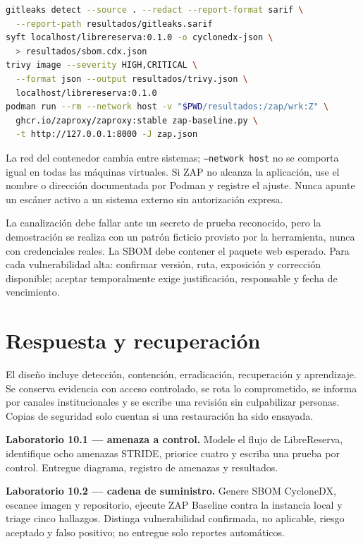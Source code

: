 \begin{lstlisting}[language=bash,caption={Controles reproducibles sobre repositorio e imagen.}]
gitleaks detect --source . --redact --report-format sarif \
  --report-path resultados/gitleaks.sarif
syft localhost/librereserva:0.1.0 -o cyclonedx-json \
  > resultados/sbom.cdx.json
trivy image --severity HIGH,CRITICAL \
  --format json --output resultados/trivy.json \
  localhost/librereserva:0.1.0
podman run --rm --network host -v "$PWD/resultados:/zap/wrk:Z" \
  ghcr.io/zaproxy/zaproxy:stable zap-baseline.py \
  -t http://127.0.0.1:8000 -J zap.json
\end{lstlisting}

La red del contenedor cambia entre sistemas; \texttt{--network host} no se comporta igual en todas las máquinas virtuales. Si ZAP no alcanza la aplicación, use el nombre o dirección documentada por Podman y registre el ajuste. Nunca apunte un escáner activo a un sistema externo sin autorización expresa.

\begin{validacion}
La canalización debe fallar ante un secreto de prueba reconocido, pero la demostración se realiza con un patrón ficticio provisto por la herramienta, nunca con credenciales reales. La SBOM debe contener el paquete web esperado. Para cada vulnerabilidad alta: confirmar versión, ruta, exposición y corrección disponible; aceptar temporalmente exige justificación, responsable y fecha de vencimiento.
\end{validacion}

\section{Respuesta y recuperación}

El diseño incluye detección, contención, erradicación, recuperación y aprendizaje. Se conserva evidencia con acceso controlado, se rota lo comprometido, se informa por canales institucionales y se escribe una revisión sin culpabilizar personas. Copias de seguridad solo cuentan si una restauración ha sido ensayada.

\begin{ejercicio}
\textbf{Laboratorio 10.1 --- amenaza a control.} Modele el flujo de LibreReserva, identifique ocho amenazas STRIDE, priorice cuatro y escriba una prueba por control. Entregue diagrama, registro de amenazas y resultados.

\textbf{Laboratorio 10.2 --- cadena de suministro.} Genere SBOM CycloneDX, escanee imagen y repositorio, ejecute ZAP Baseline contra la instancia local y triage cinco hallazgos. Distinga vulnerabilidad confirmada, no aplicable, riesgo aceptado y falso positivo; no entregue solo reportes automáticos.
\end{ejercicio}

